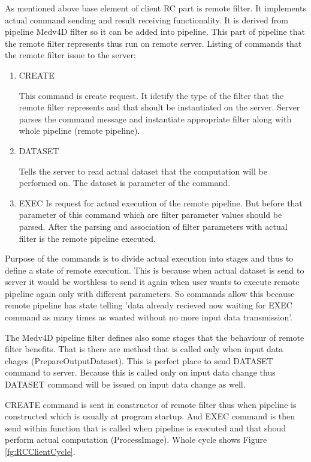 As mentioned above base element of client RC part is remote filter. It implements actual command sending and result receiving functionality. It is derived from pipeline Medv4D filter so it can be added into pipeline. This part of pipeline that the remote filter represents thus run on remote server. Listing of commands that the remote filter issue to the server:
\begin{enumerate}
  \item{CREATE}
  \par
  This command is create request. It idetify the type of the filter that the remote filter represents and that shoult be instantiated on the server. Server parses the command message and instantiate appropriate filter along with whole pipeline (remote pipeline).

  \item{DATASET}
  \par
  Tells the server to read actual dataset that the computation will be performed on. The dataset is parameter of the command.

  \item{EXEC}
  Is request for actual execution of the remote pipeline. But before that parameter of this command which are filter parameter values should be parsed. After the parsing and association of filter parameters with actual filter is the remote pipeline executed.
\end{enumerate}

\par
Purpose of the commands is to divide actual execution into stages and thus to define a state of remote execution. This is because when actual dataset is send to server it would be worthless to send it again when user wants to execute remote pipeline again only with different parameters. So commands allow this because remote pipeline has state telling 'data already recieved now waiting for EXEC command as many times as wanted without no more input data transmission'.
\par
The Medv4D pipeline filter defines also some stages that the behaviour of remote filter benefits. That is there are method that is called only when input data chages (PrepareOutputDataset). This is perfect place to send DATASET command to server. Because this is called only on input data change thus DATASET command will be issued on input data change as well.
\par
CREATE command is sent in constructor of remote filter thus when pipeline is constructed which is usually at program startup. And EXEC command is then send within function that is called when pipeline is executed and that shoud perform actual computation (ProcessImage). Whole cycle shows Figure \ref{fg:RCClientCycle}.

